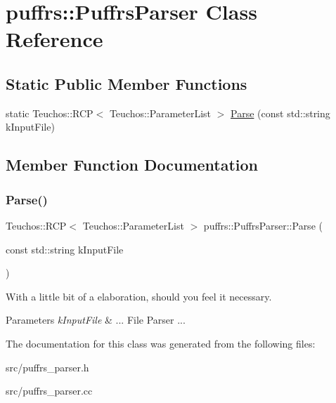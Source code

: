 \hypertarget{classpuffrs_1_1PuffrsParser}{}\section{puffrs\+:\+:Puffrs\+Parser Class Reference}
\label{classpuffrs_1_1PuffrsParser}
\subsection*{Static Public Member Functions}
\begin{DoxyCompactItemize}
\item 
static Teuchos\+::\+R\+CP$<$ Teuchos\+::\+Parameter\+List $>$ \hyperlink{classpuffrs_1_1PuffrsParser_aa41312817bfa20dc93e80790f51a720b}{Parse} (const std\+::string k\+Input\+File)
\end{DoxyCompactItemize}


\subsection{Member Function Documentation}
\mbox{\label{classpuffrs_1_1PuffrsParser_aa41312817bfa20dc93e80790f51a720b}} 
\subsubsection{\texorpdfstring{Parse()}{Parse()}}
{\footnotesize\ttfamily Teuchos\+::\+R\+CP$<$ Teuchos\+::\+Parameter\+List $>$ puffrs\+::\+Puffrs\+Parser\+::\+Parse (\begin{DoxyParamCaption}\item[{const std\+::string}]{k\+Input\+File }\end{DoxyParamCaption})\hspace{0.3cm}{\ttfamily [static]}}

With a little bit of a elaboration, should you feel it necessary. 
\begin{DoxyParams}{Parameters}
{\em k\+Input\+File} & ... File Parser ... \\
\hline
\end{DoxyParams}


The documentation for this class was generated from the following files\+:\begin{DoxyCompactItemize}
\item 
src/puffrs\+\_\+parser.\+h\item 
src/puffrs\+\_\+parser.\+cc\end{DoxyCompactItemize}
